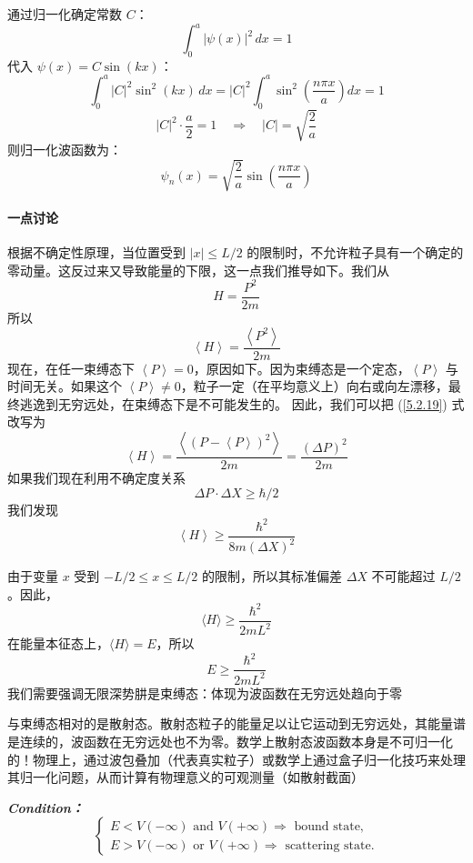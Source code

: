 通过归一化确定常数 $C$：
\[
\int_0^a |\psi(x)|^2 \,dx = 1
\]
代入 $\psi(x) = C \sin(kx)$：
\[
\int_0^a |C|^2 \sin^2(kx) \,dx = |C|^2 \int_0^a \sin^2\left( \frac{n\pi x}{a} \right) dx = 1
\]
\[
|C|^2 \cdot \frac{a}{2} = 1 \quad \Rightarrow \quad |C| = \sqrt{\frac{2}{a}}
\]
则归一化波函数为：
\[
\psi_n(x) = \sqrt{\frac{2}{a}} \sin\left( \frac{n\pi x}{a} \right)
\]
\paragraph*{一点讨论}
根据不确定性原理，当位置受到 $\left|x\right|\leqslant L/2$ 的限制时，不允许粒子具有一个确定的零动量。这反过来又导致能量的下限，这一点我们推导如下。我们从
\[
H=\frac{P^{2}}{2m}
\]
所以
\begin{equation}
	\left\langle H\right\rangle=\frac{\left\langle P^{2}\right\rangle}{2m}\label{5.2.19}
\end{equation}
现在，在任一束缚态下 $\left\langle P\right\rangle=0$，原因如下。因为束缚态是一个定态，$\left\langle P\right\rangle$ 与时间无关。如果这个 $\left\langle P\right\rangle\neq0$，粒子一定（在平均意义上）向右或向左漂移，最终逃逸到无穷远处，在束缚态下是不可能发生的。
因此，我们可以把 (\ref{5.2.19}) 式改写为
\[
\left\langle H\right\rangle=\frac{\left\langle(P-\left\langle P\right\rangle)^{2}\right\rangle}{2m}=\frac{\left(\Delta P\right)^{2}}{2m}
\]
如果我们现在利用不确定度关系
\[
\Delta P\cdot\Delta X\geqslant\hbar/2
\]
我们发现
\[
\left\langle H\right\rangle\geqslant\frac{\hbar^{2}}{8m(\Delta X)^{2}}
\]

\noindent
由于变量 $x$ 受到 $-L/2 \leq x \leq L/2$ 的限制，所以其标准偏差 $\Delta X$ 不可能超过 $L/2$。因此，
\[
\langle H \rangle \geq \frac{\hbar^{2}}{2mL^{2}}
\]
在能量本征态上，$\langle H \rangle = E$，所以
\[
E \geq \frac{\hbar^{2}}{2mL^{2}}
\]
我们需要强调无限深势肼是束缚态：体现为波函数在无穷远处趋向于零
\begin{center}
	\textit{	}
\end{center}

与束缚态相对的是散射态。散射态粒子的能量足以让它运动到无穷远处，其能量谱是连续的，波函数在无穷远处也不为零。数学上散射态波函数本身是不可归一化的！物理上，通过波包叠加（代表真实粒子）或数学上通过盒子归一化技巧来处理其归一化问题，从而计算有物理意义的可观测量（如散射截面）

\textbf{\textit{Condition：}}
\begin{equation*}
	\begin{cases}
		E < V(-\infty) \text{ and } V(+\infty) \Rightarrow \text{ bound state,} \\
		E > V(-\infty) \text{ or } V(+\infty) \Rightarrow \text{ scattering state.}
	\end{cases}	
\end{equation*}

